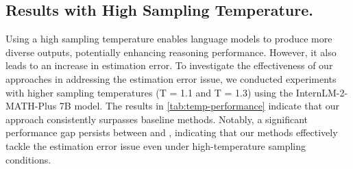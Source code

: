 \subsection{Results with High Sampling Temperature. }

Using a high sampling temperature enables language models to produce more diverse outputs, potentially enhancing reasoning performance. 
However, it also leads to an increase in estimation error. 
To investigate the effectiveness of our approaches in addressing the estimation error issue, we conducted experiments with higher sampling temperatures (T = 1.1 and T = 1.3) using the InternLM-2-MATH-Plus 7B model. The results in \autoref{tab:temp-performance} indicate that our \RPC approach consistently surpasses baseline methods. Notably, a significant performance gap persists between \RPC and \SC, indicating that our methods effectively tackle the estimation error issue even under high-temperature sampling conditions.

